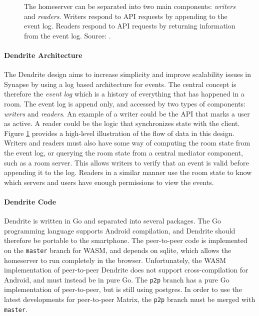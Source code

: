 \begin{figure}
    \centering
    \resizebox{0.9\linewidth}{!}{}
    \caption{
        The homeserver can be separated into two main components: \textit{writers} and \textit{readers}.
        Writers respond to API requests by appending to the event log.
        Readers respond to API requests by returning information from the event log.
        Source: \cite{dendrite_design_md}.
    }
    \label{fig:dendrite_design}
\end{figure}

\paragraph{Dendrite Architecture}
The Dendrite design aims to increase simplicity and improve scalability issues in Synapse by using a log based architecture for events.
The central concept is therefore the \textit{event log} which is a history of everything that has happened in a room.
The event log is append only, and accessed by two types of components: \textit{writers} and \textit{readers}.
An example of a writer could be the API that marks a user as active.
A reader could be the logic that synchronizes state with the client.
Figure \ref{fig:dendrite_design} provides a high-level illustration of the flow of data in this design.
Writers and readers must also have some way of computing the room state from the event log, or querying the room state from a central mediator component, such as a room server.
This allows writers to verify that an event is valid before appending it to the log.
Readers in a similar manner use the room state to know which servers and users have enough permissions to view the events.

\paragraph{Dendrite Code}
Dendrite is written in Go\cite{golang_org} and separated into several packages.
The Go programming language supports Android compilation, and Dendrite should therefore be portable to the smartphone.
The peer-to-peer code is implemented on the \texttt{master} branch for WASM, and depends on sqlite, which allows the homeserver to run completely in the browser.
Unfortunately, the WASM implementation of peer-to-peer Dendrite does not support cross-compilation for Android, and must instead be in pure Go.
The \texttt{p2p} branch has a pure Go implementation of peer-to-peer, but is still using postgres.
In order to use the latest developments for peer-to-peer Matrix, the \texttt{p2p} branch must be merged with \texttt{master}.

